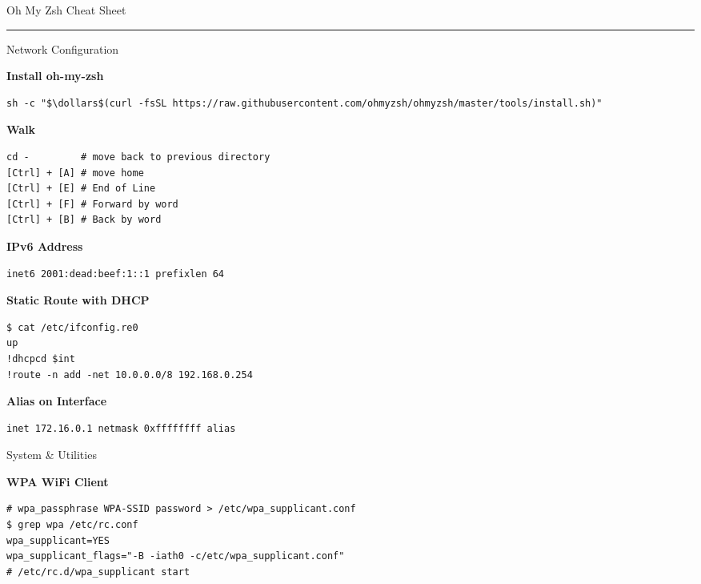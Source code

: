 \documentclass[10pt]{article}
\begin{document}
\pagestyle{empty}

{\titlefont\large \color{mygreen}Oh My Zsh Cheat Sheet}\\
\rule{\linewidth}{0.5pt}
\vspace{0.5em}

\setlength{\columnsep}{20pt}
\begin{multicols}{2}

{\titlefont\color{blueheader}\faNetworkWired\quad Network Configuration}\vspace{5pt}

\textbf{\color{blueheader}Install oh-my-zsh}
\begin{lstlisting}
sh -c "$\dollars$(curl -fsSL https://raw.githubusercontent.com/ohmyzsh/ohmyzsh/master/tools/install.sh)"
\end{lstlisting}

  \textbf{\color{blueheader}Walk}
\begin{lstlisting}
cd -         # move back to previous directory
[Ctrl] + [A] # move home
[Ctrl] + [E] # End of Line 
[Ctrl] + [F] # Forward by word 
[Ctrl] + [B] # Back by word  
\end{lstlisting}

\textbf{\color{blueheader}IPv6 Address}
\begin{lstlisting}
inet6 2001:dead:beef:1::1 prefixlen 64
\end{lstlisting}

\textbf{\color{blueheader}Static Route with DHCP}
\begin{lstlisting}
$ cat /etc/ifconfig.re0  
up  
!dhcpcd $int
!route -n add -net 10.0.0.0/8 192.168.0.254
\end{lstlisting}

\textbf{\color{blueheader}Alias on Interface}
\begin{lstlisting}
inet 172.16.0.1 netmask 0xffffffff alias
\end{lstlisting}

\vfill\null\columnbreak

{\titlefont\color{blueheader}\faTools\quad System & Utilities}\vspace{5pt}

\textbf{\color{blueheader}WPA WiFi Client}
\begin{lstlisting}
# wpa_passphrase WPA-SSID password > /etc/wpa_supplicant.conf
$ grep wpa /etc/rc.conf
wpa_supplicant=YES
wpa_supplicant_flags="-B -iath0 -c/etc/wpa_supplicant.conf"
# /etc/rc.d/wpa_supplicant start
\end{lstlisting}


\end{multicols}
\end{document}
